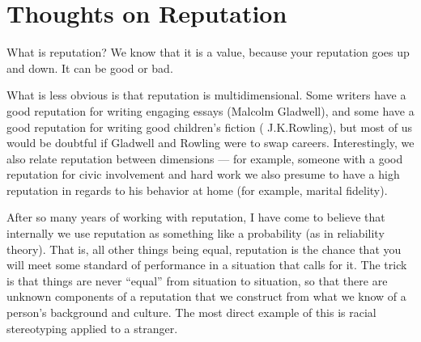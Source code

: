 \section{Thoughts on Reputation}

\begin{comment}
Used to filter too much information, as in page rank.
But also used to encourage desirable behavior
(and discourage undesirable behavior).

Does a vandal to Wikipedia care that his reputation is
tarnished?  What kind of punishment is this?

Applications: peer review, text trust, sexual offender registry, job references.
Can we use reputation to figure out whether people
fit into a company culture?

What if web search rankings were done incrementally
instead of globally?  Would this give higher reputation
to \textit{fresh} parts of the web, and gracefully
phase out crufty parts?  Crucial to this would be the
need to update reputation based on page views, or
people following links from Facebook/Google, so that
we know that a static page is still actually relevant.
\end{comment}

What is reputation?  We know that it is a value, because your reputation goes
up and down. It can be good or bad.

What is less obvious is that reputation is multidimensional.  Some writers have
a good reputation for writing engaging essays (\eg Malcolm Gladwell), and some
have a good reputation for writing good children's fiction (\eg
J.\thinspace K.\thinspace Rowling),
but most of us would be doubtful if Gladwell and Rowling were to swap careers.
Interestingly, we also relate reputation between
dimensions --- for example, someone
with a good reputation for civic involvement and hard work we also presume
to have a high reputation in regards to his behavior at home (for example,
marital fidelity).

After so many years of working with reputation, I have come to believe that
internally we use reputation as something like a probability (as in
reliability theory).
That is, all other things being equal, reputation is the chance that you
will meet some standard of performance in a situation that calls for it.
The trick is that things are never ``equal'' from situation to
situation, so that there are unknown components of a reputation that we
construct from what we know of a person's background and culture.
The most direct example of this is racial stereotyping applied to
a stranger.


